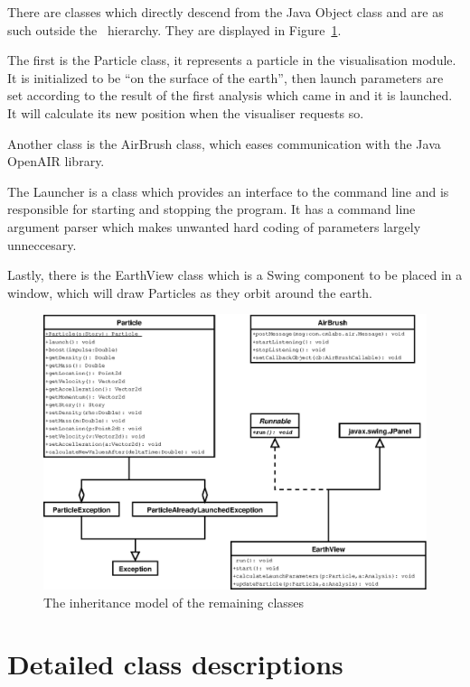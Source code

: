 There are classes which directly descend from the Java Object class and are as
such outside the \Amber\ hierarchy. They are displayed in
Figure~\ref{fig:class-diagram}.

The first is the Particle class, it represents a particle in the visualisation
module. It is initialized to be ``on the surface of the earth'', then launch
parameters are set according to the result of the first analysis which came in
and it is launched. It will calculate its new position when the visualiser
requests so.

Another class is the AirBrush class, which eases communication with the Java
OpenAIR library.

The Launcher is a class which provides an interface to the command line and is
responsible for starting and stopping the program. It has a command line
argument parser which makes unwanted hard coding of parameters largely
unneccesary.

Lastly, there is the EarthView class which is a Swing component to be placed in
a window, which will draw Particles as they orbit around the earth.

\begin{figure}[htp]
  \centering
  \includegraphics{image/class-diagram}
  \caption{
    \label{fig:class-diagram}
    The inheritance model of the remaining classes}
\end{figure}

\section{Detailed class descriptions}

